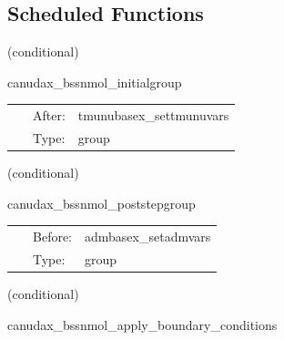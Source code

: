 \subsection*{Scheduled Functions}
\vspace{5mm}

   (conditional) 

\hspace{5mm} canudax\_bssnmol\_initialgroup 

\hspace{5mm}{\it canudax\_bssnmol: initial bin } 


\hspace{5mm}

 \begin{tabular*}{160mm}{cll} 
~ & After:  & tmunubasex\_settmunuvars \\ 
~ & Type:  & group \\ 
\end{tabular*} 


\vspace{5mm}

   (conditional) 

\hspace{5mm} canudax\_bssnmol\_poststepgroup 

\hspace{5mm}{\it canudax\_bssnmol: post-step operations } 


\hspace{5mm}

 \begin{tabular*}{160mm}{cll} 
~ & Before:  & admbasex\_setadmvars \\ 
~ & Type:  & group \\ 
\end{tabular*} 


\vspace{5mm}

   (conditional) 

\hspace{5mm} canudax\_bssnmol\_apply\_boundary\_conditions 

\hspace{5mm}{\it apply radiative boundary conditions  } 


\hspace{5mm}

